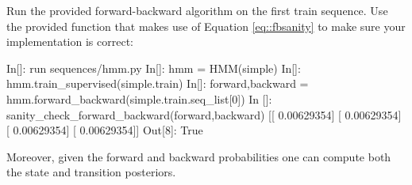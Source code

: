 \begin{exercise}
%
%

Run the provided forward-backward algorithm on the first train sequence. Use the provided function that makes use of Equation \ref{eq::fbsanity} to make
sure your implementation is correct:
 
\begin{python}
In[]:  run sequences/hmm.py
In[]: hmm = HMM(simple)
In[]: hmm.train_supervised(simple.train)
In[]: forward,backward =  hmm.forward_backward(simple.train.seq_list[0])
In []: sanity_check_forward_backward(forward,backward)
[[ 0.00629354]
 [ 0.00629354]
 [ 0.00629354]
 [ 0.00629354]]
Out[8]: True
\end{python}
\end{exercise}

Moreover, given the forward and backward probabilities one can compute both the state
and transition posteriors.

